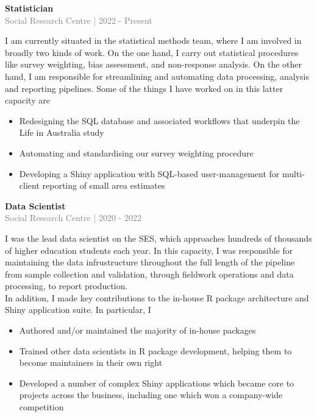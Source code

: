 \documentclass[10pt]{article}
\begin{document}
{\bf Statistician} \\
\textcolor{gray}{Social Research Centre | 2022 - Present} \\[3pt]
\begin{small}
I am currently situated in the statistical methods team, where I am involved in broadly two kinds of work. 
On the one hand, I carry out statistical procedures like survey weighting, bias assessment, and non-response analysis. 
On the other hand, I am responsible for streamlining and automating data processing, analysis and reporting pipelines. Some of the things I have worked on in this latter capacity are

\begin{itemize}
  \item Redesigning the SQL database and associated workflows that underpin the Life in Australia study
  \item Automating and standardising our survey weighting procedure
  \item Developing a Shiny application with SQL-based user-management for multi-client reporting of small area estimates
\end{itemize}

\end{small}

\vspace{0.5cm}
{\bf Data Scientist} \\
\textcolor{gray}{Social Research Centre | 2020 - 2022} \\[3pt]
\begin{small}
I was the lead data scientist on the SES, which approaches hundreds of thousands of higher education students each year. In this capacity, I was responsible for maintaining the data infrustructure throughout the full length of the pipeline from sample collection and validation, through fieldwork operations and data processing, to report production.
\\

In addition, I made key contributions to the in-house R package architecture and Shiny application suite. In particular, I

\begin{itemize}
  \item Authored and/or maintained the majority of in-house packages
  \item Trained other data scientists in R package development, helping them to become maintainers in their own right
  \item Developed a number of complex Shiny applications which became core to projects across the business, including one which won a company-wide competition
\end{itemize}
\end{small}
\end{document}
